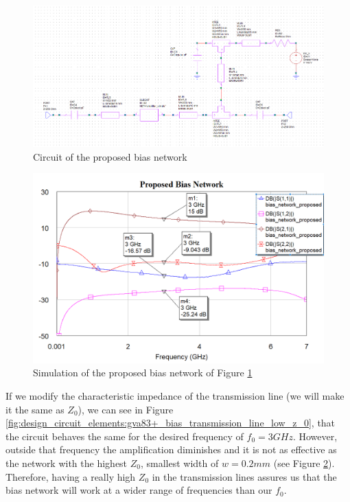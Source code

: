 \documentclass[12pt]{report} %
\begin{document}
\begin{figure}[htbp]
    \centering
    \includegraphics[width=1\linewidth]{images//design_circuit_elements/bias_network_proposed_circuit.png}
    \caption{Circuit of the proposed bias network}
    \label{fig:design_circuit_elements:bias_network_proposed_circuit}
\end{figure}

\begin{figure}[htbp]
    \centering
    \includegraphics[width=1\linewidth]{images//design_circuit_elements/bias_network_proposed_graph.png}
    \caption{Simulation of the proposed bias network of Figure \ref{fig:design_circuit_elements:bias_network_proposed_circuit}}
    \label{fig:design_circuit_elements:bias_network_proposed_graph}
\end{figure}

If we modify the characteristic impedance of the transmission line (we will make it the same as $Z_0$), we can see in Figure \ref{fig:design_circuit_elements:gva83+_bias_transmission_line_low_z_0}, that the circuit behaves the same for the desired frequency of $f_0 = 3 GHz$. However, outside that frequency the amplification diminishes and it is not as effective as the network with the highest $Z_0$, smallest width of $w = 0.2 mm$ (see Figure \ref{fig:design_circuit_elements:bias_network_proposed_graph}). Therefore, having a really high $Z_0$ in the transmission lines assures us that the bias network will work at a wider range of frequencies than our $f_0$.
\end{document}
